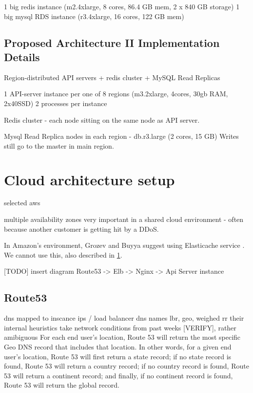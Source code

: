 \documentclass{uvamscse}
\begin{document}
1 big redis instance (m2.4xlarge, 8 cores, 86.4 GB mem, 2 x 840 GB storage)
1 big mysql RDS instance (r3.4xlarge, 16 cores, 122 GB mem)

\subsection{Proposed Architecture II Implementation Details}\label{Proposed Architecture II Implementation Details}
Region-distributed API servers + redis cluster + MySQL Read Replicas

1 API-server instance per one of 8 regions (m3.2xlarge, 4cores, 30gb RAM, 2x40SSD)
2 processes per instance

Redis cluster - each node sitting on the same node as API server.

Mysql Read Replica nodes in each region - db.r3.large (2 cores, 15 GB)
Writes still go to the master in main region.

\section{Cloud architecture setup} \label{Cloud architecture setup}

selected aws

multiple availability zones very important in a shared cloud environment - often because another customer is getting hit by a DDoS.\cite{GroBuy}

In Amazon’s environment, Grozev and Buyya suggest using Elasticache service \cite{GroBuy}. We cannot use this, also described in \ref{Cloud architecture setup}.

[TODO] insert diagram
Route53 -> Elb -> Nginx -> Api Server instance

\subsection{Route53}
  dns mapped to inscance ips / load balancer dns names
  lbr, geo, weighed rr
  their internal heuristics take network conditions from past weeks [VERIFY], rather amibiguous
  For each end user’s location, Route 53 will return the most specific Geo DNS record that includes that location. In other words, for a given end user’s location, Route 53 will first return a state record; if no state record is found, Route 53 will return a country record; if no country record is found, Route 53 will return a continent record; and finally, if no continent record is found, Route 53 will return the global record.
\end{document}
